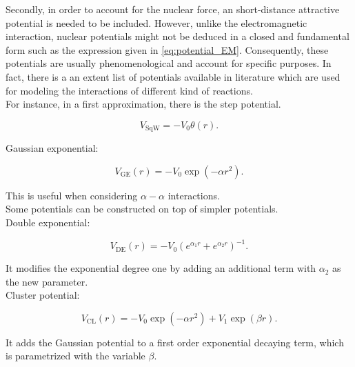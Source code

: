 \documentclass[openany]{book}
\begin{document}
Secondly, in order to account for the nuclear force, an short-distance attractive potential is needed to be included. However, unlike the electromagnetic interaction, nuclear potentials might not be deduced  in a closed and fundamental form such as the expression given in \ref{eq:potential_EM}. Consequently, these  potentials are usually phenomenological and account for specific purposes. In fact, there is a an extent list of potentials available in literature which are used for modeling the interactions of different kind of reactions. \\

For instance, in a first approximation, there is the step potential.

\begin{equation} \label{eq:potential_squareWell}
	V_{\mathrm{SqW}} = -V_0\theta(r).
\end{equation}

Gaussian exponential: 

\begin{equation} \label{eq:potential_gaussianExponential}
	V_{\mathrm{GE}}(r) = - V_0 \exp{(-\alpha r^2 )}.
\end{equation}

This is useful when considering $\alpha-\alpha$ interactions.  \\

Some potentials can be constructed on top of simpler potentials. \\

Double exponential:

\begin{equation} \label{eq:potential_doubleExponential}
	V_{\mathrm{DE}}(r) = - V_0 \left(e^{\alpha_1 r} + e^{\alpha_2 r} \right)^{-1}.
\end{equation}

It modifies the exponential degree one by adding an additional term with $\alpha_2$ as the new parameter. \\

Cluster potential:

\begin{equation} \label{eq:potential_cluster}
	V_{\mathrm{CL}}(r) = - V_0 \exp{(-\alpha r^2 )} + V_1 \exp{(\beta r)}.
\end{equation}

It adds the Gaussian potential to a first order exponential decaying term, which is parametrized with the variable $\beta$. \\
\end{document}

